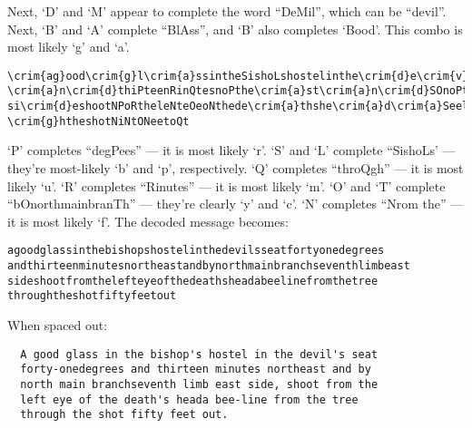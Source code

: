 \begin{Answer}
\noindent
Next, `D' and `M' appear to complete the word ``DeMil'', which can be ``devil''.
\newline
Next, `B' and `A' complete ``BlAss'', and `B' also completes `Bood'.
This combo is most likely `g' and `a'.
\color{blue}
\begin{Verbatim}[commandchars=\\\{\}]
\crim{ag}ood\crim{g}l\crim{a}ssintheSishoLshostelinthe\crim{d}e\crim{v}ilsse\crim{a}tNoPtOone\crim{d}e\crim{g}Pees
\crim{a}n\crim{d}thiPteenRinQtesnoPthe\crim{a}st\crim{a}n\crim{d}SOnoPthR\crim{a}inSP\crim{a}nThse\crim{v}enthliRSe\crim{a}st
si\crim{d}eshootNPoRtheleNteOeoNthede\crim{a}thshe\crim{a}d\crim{a}SeelineNPoRthetPeethPoQ
\crim{g}htheshotNiNtONeetoQt
\end{Verbatim}
\color{black}
\noindent
`P' completes ``degPees'' --- it is most likely `r'.
\newline
`S' and `L' complete ``SishoLs' --- they're most-likely `b' and `p', respectively.
\newline
`Q' completes ``throQgh'' --- it is most likely `u'.
\newline
`R' completes ``Rinutes'' --- it is most likely `m'.
\newline
`O' and `T' complete ``bOnorthmainbranTh'' --- they're clearly
`y' and `c'.
\newline
`N' completes ``Nrom the'' --- it is most likely `f'.
\newline
\newpage
The decoded message becomes:
\color{crimson}
\begin{verbatim}
agoodglassinthebishopshostelinthedevilsseatfortyonedegrees
andthirteenminutesnortheastandbynorthmainbranchseventhlimbeast
sideshootfromthelefteyeofthedeathsheadabeelinefromthetree
throughtheshotfiftyfeetout
\end{verbatim}
\color{black}
When spaced out:
\color{crimson}
\begin{verbatim}
  A good glass in the bishop's hostel in the devil's seat
  forty-onedegrees and thirteen minutes northeast and by
  north main branchseventh limb east side, shoot from the
  left eye of the death's heada bee-line from the tree
  through the shot fifty feet out.
  \end{verbatim}
\end{Answer}
